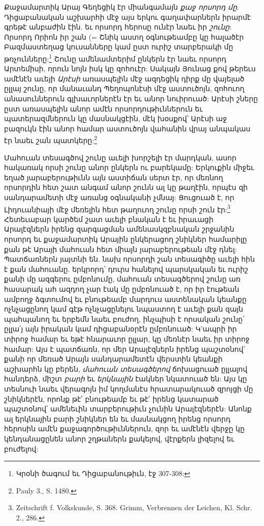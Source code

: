 \documentclass{article}
\begin{document}
{Քաջամարտիկ Արայ Գեղեցիկ էր միանգամայն \emph{քաջ որսորդ մը}. Դիցաբանական աշխարհի մէջ այս երկու գաղափարներն իրարմէ գրեթէ անբաժին էին. եւ որսորդ հերոսը ունէր նաեւ իր \emph{շունը}: Որսորդ Որիոն իր շան (= Շնիկ աստղ օգնութեամբը կը հալածէր Բազմաստեղաց կուսանները կամ ըստ ուրիշ տարբերակի մը թռչունները:\footnote{Կրօնի ծագում եւ Դիցաբանութիւն, էջ 307-308:} Շունը ամենամտերիմ ընկերն էր նաեւ որսորդ Արտեմիսի, որուն նոյն իսկ կը զոհուէր: Սակայն Յունաց քով թերեւս ամէնէն աւեյի \emph{Արէսի} առասպելին մէջ ազդեցիկ դիրք մը վայելած ըլլայ շունը, որ մանաւանդ Պեղոպոնէսի մէջ աստուծոյն, զոհուող անասուններուն գլխաւորներէն էր եւ անոր նուիրուած: Արէսի շները ըստ առասպելին անոր ամէն որսորդութիւններուն եւ պատերազմներուն կը մասնակցէին, մէկ խօսքով՝ Արէսի աջ բազուկն էին անոր համար աստուծոյն վահանին վրայ անպակաս էր նաեւ շան պատկերը:\footnote{Pauly 3., S. 1480.}

Մահուան տեսագծով շունը աւելի խորշելի էր մարդկան, ասոր հակառակ որսի շունը անոր ընկերն ու բարեկամը: Երկուքին միջեւ եղած յարաբերութիւնն այն աստիճան սերտ էր, որ մեռնող որսորդին հետ շատ անգամ անոր շունն ալ կը թաղէին, որպէս զի սանդարամետի մէջ առանց օգնականի չմնայ: Ցուցուած է, որ Լիդուանիայի մէջ մեռելին հետ թաղուող շունը որսի շուն էր:\footnote{Zeitschrift f. Volkskunde, S. 368. Grimm, Verbrennen der Leichen, Kl. Schr. 2., 286.} Հետեւաբար կարծեմ շատ աւելի բնական է եւ իրաւացի Արալէզներն իրենց զարգացման ամենասկզբնական շրջանին որսորդ եւ քաջամարտիկ Արային ընկերացող շնիկներ համարիլը քան թէ Արայի մահուան հետ միայն յարաբերութեան մէջ դնել: Պատճառներն յայտնի են. նախ որսորդի շան տեսագիծը աւելի հին է քան մահուանը. երկրորդ՝ դուրս հանելով պարսկական եւ ուրիշ քանի մը ազգերու ըմբոնումը, մահուան տեսագծերով շունը առ հասարակ ահ ազդող չար էակ մը ըմբռնուած է, որ իր էութեան ամբողջ ձգտումով եւ բնութեամբ մարդուս աստենական կեանքը ոչնչացընող կամ գէթ ոչնչացընելու նպաստող է աւելի քան զայն պահպանող եւ երբեմն նաեւ բուժող, ինչպիսի է որսական շունը՝ ըլլա՛յ այն իրական կամ դիցաբանօրէն ըմբռնուած: Կ'ապրի իր տիրոջ համար եւ եթէ հնարաւոր ըլլար, կը մեռնէր նաեւ իր տիրոջ համար: Այս է պատճառն, որ մեր Արալէզներն իրենց պաշտօնով՝ քանի որ մեռած Արայն սանդարամետէն վերստին կեանքի աշխարհն կը բերեն, \emph{մահուան տեսագծերով} ճոխացուած ըլլալով հանդերձ, միշտ \emph{բարի} եւ \emph{երկնային} էակներ նկատուած են: Այս կը տեսնուի նաեւ վերագոյն իմ կողմանէս հրատարակուած զրոյցի մը շնիկներէն, որոնք թէ՛ բնութեամբ եւ թէ՛ իրենց կատարած պաշտօնով՝ ամենեւին տարբերութիւն չունին Արալէզներէն: Անոնք ալ երկնային բարի շնիկներ են եւ մասնակցող իրենց որսորդ հերոսին ամէն քաջագործութիւններուն, զոր եւ ամէնէն վերջը կը կենդանացընեն անոր շղթաներն քակելով, վէրքերն լիզելով եւ բուժելով:

}
\end{document}

